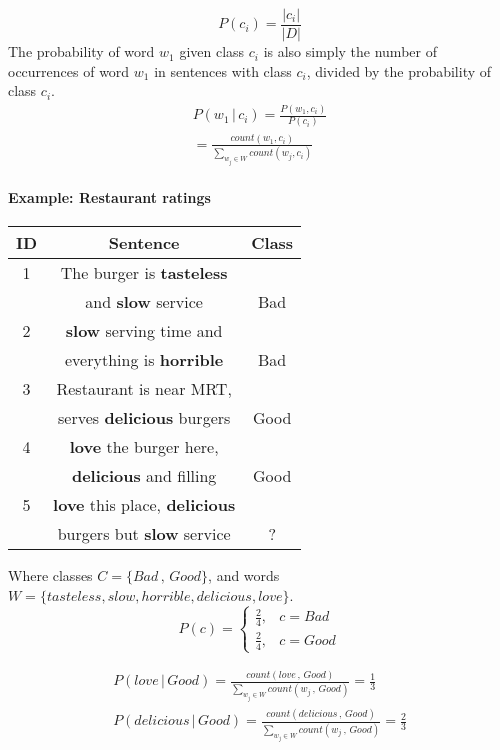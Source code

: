 \documentclass[9pt,twocolumn]{article}
\begin{document}
\begin{equation}
	P(c_i) = \frac{|c_i|}{|D|}
\end{equation}
The probability of word $w_1$ given class $c_i$ is also simply the number of occurrences of word $w_1$ in sentences with class $c_i$, divided by the probability of class $c_i$.
\begin{equation}
\begin{split}
	P(w_1\,|\,c_i) = \frac{P(w_1,c_i)}{P(c_i)}\\
	= \frac{count(w_1,c_i)}{\sum_{w_j\in W}count(w_j,c_i)}
\end{split}
\end{equation}

\paragraph*{Example: Restaurant ratings}
\begin{center}
\begin{tabular}{ |c|c|c| } 
\hline
ID & Sentence & Class \\
\hline
1& The burger is \textbf{tasteless} & \\
  & and \textbf{slow} service        & Bad\\
2& \textbf{slow} serving time and & \\
 & everything is \textbf{horrible} & Bad\\
3& Restaurant is near MRT, & \\
 & serves \textbf{delicious} burgers & Good\\
4& \textbf{love} the burger here, & \\
 & \textbf{delicious} and filling & Good\\
\hline
5& \textbf{love} this place, \textbf{delicious} & \\
 & burgers but \textbf{slow} service & ?\\
\hline
\end{tabular}
\end{center}
Where classes $C = \{Bad\,,\,Good\}$, and words $W = \{tasteless, slow, horrible, delicious, love\}$.
\begin{equation}
	P(c) = 
	\begin{cases}
      \frac{2}{4}, & c = Bad \\
      \frac{2}{4}, & c = Good
    \end{cases}
\end{equation}

\begin{equation}
\begin{split}
P(love\,|\,Good) = \frac{count(love\,,\,Good)}{\sum_{w_j\in W}count(w_j\,,\,Good)} = \frac{1}{3}\\
P(delicious\,|\,Good) = \frac{count(delicious\,,\,Good)}{\sum_{w_j\in W}count(w_j\,,\,Good)} = \frac{2}{3}\\
\end{split}
\end{equation}
\end{document}
